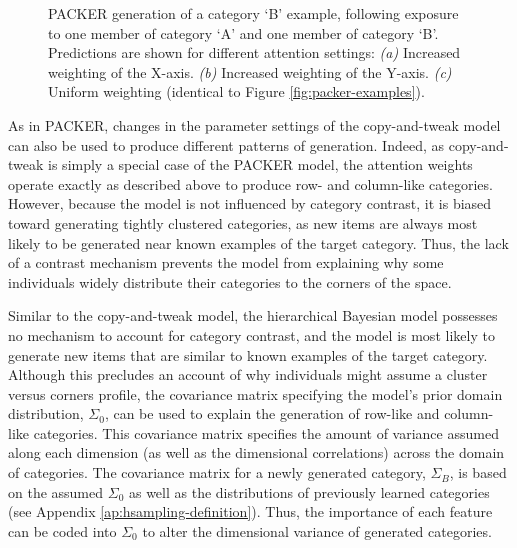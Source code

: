 \documentclass[12pt]{article}
\newcommand\inputpgf[2]{{
\let\pgfimageWithoutPath\pgfimage
\renewcommand{\pgfimage}[2][]{\pgfimageWithoutPath[##1]{#1/##2}}

}}
\begin{document}
\begin{flushleft}
\begin{figure}
    \begin{center} \inputpgf{figs/}{packer-attention-examples.pgf}
    \caption{PACKER generation of a category `B' example, following exposure to
one member of category `A' and one member of category `B'. Predictions are shown
for different attention settings: {\em (a)} Increased weighting of the X-axis.
{\em (b)} Increased weighting of the Y-axis. {\em (c)} Uniform weighting
(identical to Figure \ref{fig:packer-examples}).}
    \label{fig:packer-attention}
    \end{center}
\end{figure}

As in PACKER, changes in the parameter settings of the copy-and-tweak model can
also be used to produce different patterns of generation. Indeed, as
copy-and-tweak is simply a special case of the PACKER model, the attention
weights operate exactly as described above to produce row- and column-like
categories. However, because the model is not influenced by category contrast,
it is biased toward generating tightly clustered categories, as new items are
always most likely to be generated near known examples of the target category.
Thus, the lack of a contrast mechanism prevents the model from explaining why
some individuals widely distribute their categories to the corners of the space.

Similar to the copy-and-tweak model, the hierarchical Bayesian model possesses
no mechanism to account for category contrast, and the model is most likely to
generate new items that are similar to known examples of the target category.
Although this precludes an account of why individuals might assume a cluster
versus corners profile, the covariance matrix specifying the model's prior
domain distribution, $\Sigma_0$, can be used to explain the generation of
row-like and column-like categories. This covariance matrix specifies the amount
of variance assumed along each dimension (as well as the dimensional
correlations) across the domain of categories. The covariance matrix for a newly
generated category, $\Sigma_B$, is based on the assumed $\Sigma_0$ as well as
the distributions of previously learned categories (see Appendix
\ref{ap:hsampling-definition}). Thus, the importance of each feature can be
coded into $\Sigma_0$ to alter the dimensional variance of generated categories.


\end{flushleft}
\end{document}
